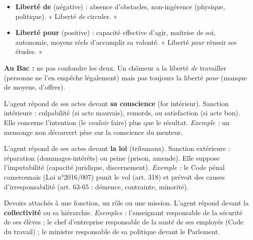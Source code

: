 \documentclass[11pt]{article}
\newcommand{\cle}[1]{{\popxbold\color{popdark}#1}}
\newcounter{popsec}
\newcounter{popsub}
\newcommand{\courssub}[1]{%
  \stepcounter{popsub}%
  \par\vspace{9pt}\noindent{\popxbold\fontsize{11.5}{13}\selectfont\color{popink}{\color{poporange}\thepopsec.\thepopsub}\hspace{6pt}#1}\par\nopagebreak\vspace{4pt}
}
\begin{document}
\begin{propriete}
\begin{itemize}
\item \textbf{Liberté de} (négative) : absence d'obstacles, non-ingérence (physique, politique). « Liberté \emph{de} circuler. »
\item \textbf{Liberté pour} (positive) : capacité effective d'agir, maîtrise de soi, autonomie, moyens réels d'accomplir sa volonté. « Liberté \emph{pour} réussir ses études. »
\end{itemize}
\textbf{Au Bac :} ne pas confondre les deux. Un chômeur a la liberté \emph{de} travailler (personne ne l'en empêche légalement) mais pas toujours la liberté \emph{pour} (manque de moyens, d'offres).
\end{propriete}

\courssub{Les formes de la responsabilité}

\begin{definition}
L'agent répond de ses actes devant \textbf{sa conscience} (for intérieur). Sanction intérieure : \cle{culpabilité} (si acte mauvais), \cle{remords}, ou \cle{satisfaction} (si acte bon). Elle concerne l'intention (le \emph{vouloir} faire) plus que le résultat. \emph{Exemple :} un mensonge non découvert pèse sur la conscience du menteur.
\end{definition}

\begin{definition}
L'agent répond de ses actes devant \textbf{la loi} (tribunaux). Sanction extérieure : \cle{réparation} (dommages-intérêts) ou \cle{peine} (prison, amende). Elle suppose l'imputabilité (capacité juridique, discernement). \emph{Exemple :} le Code pénal camerounais (Loi n°2016/007) punit le vol (art. 318) et prévoit des causes d'irresponsabilité (art. 63-65 : démence, contrainte, minorité).
\end{definition}

\begin{definition}
Devoirs attachés à une \cle{fonction}, un \cle{rôle} ou une \cle{mission}. L'agent répond devant la \textbf{collectivité} ou sa \cle{hiérarchie}. \emph{Exemples :} l'enseignant responsable de la sécurité de ses élèves ; le chef d'entreprise responsable de la santé de ses employés (Code du travail) ; le ministre responsable de sa politique devant le Parlement.
\end{definition}
\end{document}
